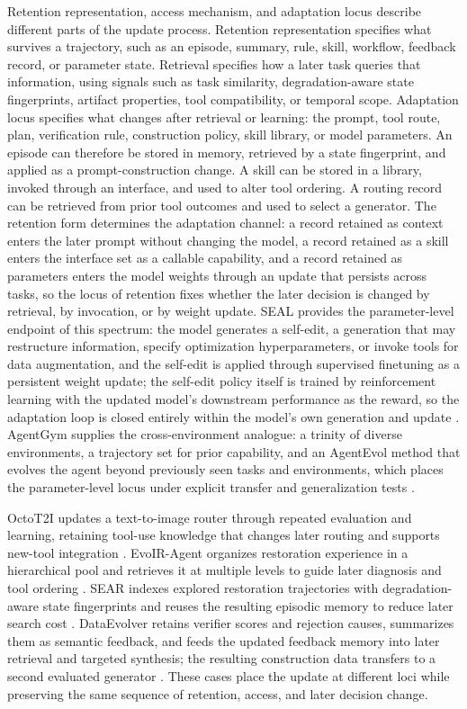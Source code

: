 Retention representation, access mechanism, and adaptation locus describe different parts of the update process. Retention representation specifies what survives a trajectory, such as an episode, summary, rule, skill, workflow, feedback record, or parameter state. Retrieval specifies how a later task queries that information, using signals such as task similarity, degradation-aware state fingerprints, artifact properties, tool compatibility, or temporal scope. Adaptation locus specifies what changes after retrieval or learning: the prompt, tool route, plan, verification rule, construction policy, skill library, or model parameters. An episode can therefore be stored in memory, retrieved by a state fingerprint, and applied as a prompt-construction change. A skill can be stored in a library, invoked through an interface, and used to alter tool ordering. A routing record can be retrieved from prior tool outcomes and used to select a generator. The retention form determines the adaptation channel: a record retained as context enters the later prompt without changing the model, a record retained as a skill enters the interface set as a callable capability, and a record retained as parameters enters the model weights through an update that persists across tasks, so the locus of retention fixes whether the later decision is changed by retrieval, by invocation, or by weight update. SEAL provides the parameter-level endpoint of this spectrum: the model generates a self-edit, a generation that may restructure information, specify optimization hyperparameters, or invoke tools for data augmentation, and the self-edit is applied through supervised finetuning as a persistent weight update; the self-edit policy itself is trained by reinforcement learning with the updated model's downstream performance as the reward, so the adaptation loop is closed entirely within the model's own generation and update \cite{pari2025seal}. AgentGym supplies the cross-environment analogue: a trinity of diverse environments, a trajectory set for prior capability, and an AgentEvol method that evolves the agent beyond previously seen tasks and environments, which places the parameter-level locus under explicit transfer and generalization tests \cite{xi2024agentgym}.

OctoT2I updates a text-to-image router through repeated evaluation and learning, retaining tool-use knowledge that changes later routing and supports new-tool integration \cite{jiang2026octot2i}. EvoIR-Agent organizes restoration experience in a hierarchical pool and retrieves it at multiple levels to guide later diagnosis and tool ordering \cite{avg260522208}. SEAR indexes explored restoration trajectories with degradation-aware state fingerprints and reuses the resulting episodic memory to reduce later search cost \cite{avg260628971}. DataEvolver retains verifier scores and rejection causes, summarizes them as semantic feedback, and feeds the updated feedback memory into later retrieval and targeted synthesis; the resulting construction data transfers to a second evaluated generator \cite{avg260631537}. These cases place the update at different loci while preserving the same sequence of retention, access, and later decision change.

